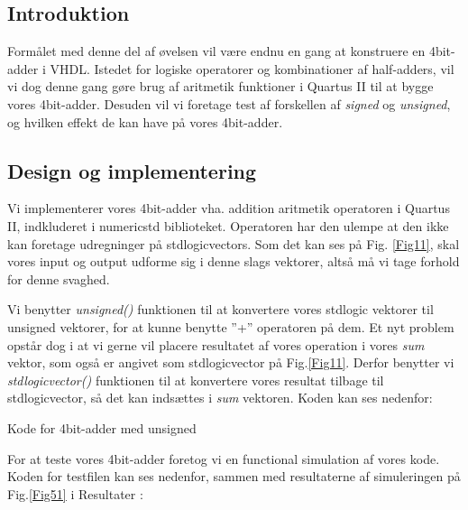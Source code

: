\documentclass[../journal2.tex]{subfiles}
\begin{document}
\subsection{Introduktion}
Formålet med denne del af øvelsen vil være endnu en gang at konstruere en 4bit-adder i VHDL. Istedet for logiske operatorer og kombinationer af half-adders, vil vi dog denne gang gøre brug af aritmetik funktioner i Quartus II til at bygge vores 4bit-adder. Desuden vil vi foretage test af forskellen af \textit{signed} og \textit{unsigned}, og hvilken effekt de kan have på vores 4bit-adder.

\subsection{Design og implementering}

Vi implementerer vores 4bit-adder vha. addition aritmetik operatoren i Quartus II, indkluderet i numeric\textunderscore std biblioteket. Operatoren har den ulempe at den ikke kan foretage udregninger på std\textunderscore logic\textunderscore vectors. Som det kan ses på Fig. \ref{Fig11}, skal vores input og output udforme sig i denne slags vektorer, altså må vi tage forhold for denne svaghed.



Vi benytter \textit{unsigned()} funktionen til at konvertere vores std\textunderscore logic vektorer til unsigned vektorer, for at kunne benytte ''+'' operatoren på dem. Et nyt problem opstår dog i at vi gerne vil placere resultatet af vores operation i vores \textit{sum} vektor, som også er angivet som std\textunderscore logic\textunderscore vector på Fig.\ref{Fig11}. Derfor benytter vi \textit{std\textunderscore logic\textunderscore vector()} funktionen til at konvertere vores resultat tilbage til std\textunderscore logic\textunderscore vector, så det kan indsættes i \textit{sum} vektoren. Koden kan ses nedenfor:

\begin{table}[H]
    \centering
      \framebox{
        \rule{8pt}{0pt}
          
  }
  \caption{Kode for 4bit-adder med unsigned}	
  \label{src:Tab11}
\end{table}

For at teste vores 4bit-adder foretog vi en functional simulation af vores kode. Koden for testfilen kan ses nedenfor, sammen med resultaterne af simuleringen på Fig.\ref{Fig51} i Resultater :
\end{document}
